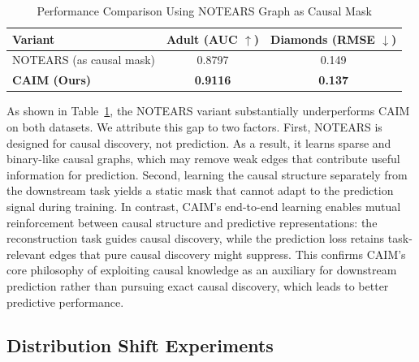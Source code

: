 \documentclass[sigconf, nonacm]{acmart}
\newcommand{\icde}[1]{{\color{black}#1}}
\newcommand{\syfix}[1]{{\color{black}#1}}
\newcommand{\syne}[1]{{\color{black}#1}}
\newcommand*{\ourmodel}{CAIM}
\begin{document}
\begin{table}[h]
  \caption{Performance Comparison Using NOTEARS Graph as Causal Mask}
  \label{tab:notears_mask}
  \centering
  \small
  \setlength{\tabcolsep}{2pt}
  \begin{tabular}{lcc}
    \toprule
    Variant & Adult (AUC $\uparrow$) & Diamonds (RMSE $\downarrow$) \\
    \midrule
    NOTEARS (as causal mask) & 0.8797 & 0.149 \\
    \textbf{\ourmodel{} (Ours)} & \syne{\textbf{0.9116}} & \syne{\textbf{0.137}} \\
    \bottomrule
  \end{tabular}
\end{table}

As shown in Table~\ref{tab:notears_mask}, the NOTEARS variant substantially underperforms \ourmodel{} on both datasets. We attribute this gap to two factors. \syfix{First, NOTEARS is designed for causal discovery, not prediction. 
As a result, it learns sparse and binary-like causal graphs, which may remove weak edges that contribute useful information for prediction.}
Second, learning the causal structure \icde{separately from the downstream task} 
yields a static mask that cannot adapt to the prediction signal during training. 
In contrast, \ourmodel{}'s end-to-end learning enables mutual reinforcement between causal structure and predictive representations:
the reconstruction task guides causal discovery, while the prediction loss retains task-relevant edges that pure causal discovery might suppress.
\icde{
This confirms \ourmodel{}'s core philosophy of exploiting causal knowledge as an auxiliary for downstream prediction rather than pursuing exact causal discovery, which leads to better predictive performance.
}

\subsection{Distribution Shift Experiments}
\end{document}
